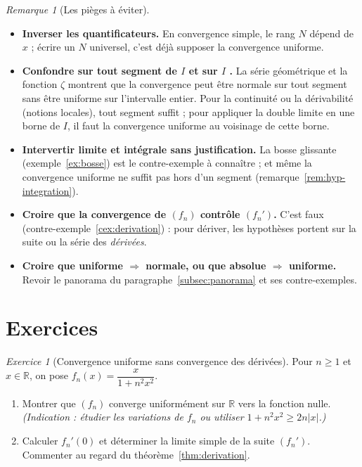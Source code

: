 \documentclass[11pt,a4paper]{article}
\theoremstyle{plain}
\theoremstyle{definition}
\theoremstyle{remark}
\newtheorem{remarque}[theoreme]{Remarque}
\newtheorem{exercice}{Exercice}
\newcommand{\R}{\mathbb{R}}
\numberwithin{equation}{section}
\begin{document}
\begin{remarque}[Les pièges à éviter]
\begin{itemize}
    \item \textbf{Inverser les quantificateurs.} En convergence simple, le
    rang $N$ dépend de $x$ ; écrire un $N$ universel, c'est déjà supposer
    la convergence uniforme.
    \item \textbf{Confondre \og sur tout segment de $I$ \fg{} et
    \og sur $I$ \fg.} La série géométrique et la fonction $\zeta$ montrent
    que la convergence peut être normale sur tout segment sans être
    uniforme sur l'intervalle entier. Pour la continuité ou la
    dérivabilité (notions locales), tout segment suffit ; pour appliquer
    la double limite en une borne de $I$, il faut la convergence uniforme
    au voisinage de cette borne.
    \item \textbf{Intervertir limite et intégrale sans justification.} La
    bosse glissante (exemple~\ref{ex:bosse}) est le contre-exemple à
    connaître ; et même la convergence uniforme ne suffit pas hors d'un
    segment (remarque~\ref{rem:hyp-integration}).
    \item \textbf{Croire que la convergence de $(f_n)$ contrôle
    $(f_n')$.} C'est faux (contre-exemple~\ref{cex:derivation}) : pour
    dériver, les hypothèses portent sur la suite ou la série des
    \emph{dérivées}.
    \item \textbf{Croire que uniforme $\Rightarrow$ normale, ou que
    absolue $\Rightarrow$ uniforme.} Revoir le panorama du
    paragraphe~\ref{subsec:panorama} et ses contre-exemples.
\end{itemize}
\end{remarque}

\section{Exercices}

\begin{exercice}[Convergence uniforme sans convergence des dérivées]
Pour $n\geq 1$ et $x\in\R$, on pose $f_n(x)=\dfrac{x}{1+n^2x^2}$.
\begin{enumerate}
    \item Montrer que $(f_n)$ converge uniformément sur $\R$ vers la
    fonction nulle. \emph{(Indication : étudier les variations de $f_n$
    ou utiliser $1+n^2x^2\geq 2n\lvert x\rvert$.)}
    \item Calculer $f_n'(0)$ et déterminer la limite simple de la suite
    $(f_n')$. Commenter au regard du théorème~\ref{thm:derivation}.
\end{enumerate}
\end{exercice}
\end{document}
